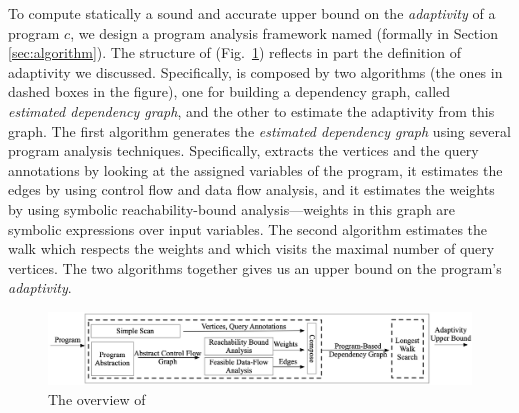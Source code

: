 To compute statically a sound and accurate upper bound on the \emph{adaptivity} of a program $c$,
we design a program analysis framework named {\THESYSTEM} (formally in Section \ref{sec:algorithm}). 
The structure of {\THESYSTEM} (Fig.~\ref{fig:adaptfun}) reflects in part the definition of adaptivity we discussed. Specifically, {\THESYSTEM} is composed by two algorithms (the ones in dashed boxes in the figure), one for building a dependency graph, called \emph{estimated dependency graph}, and the other to estimate the adaptivity from this graph.  
The first algorithm generates the \emph{estimated dependency graph} using several program analysis techniques. Specifically,
 {\THESYSTEM} extracts the vertices and the query annotations by looking at the assigned variables of the program, it estimates the edges by using control flow and data flow analysis, and it estimates the weights by using symbolic reachability-bound analysis---weights in this graph are symbolic expressions over input variables. 
The second algorithm estimates the
walk which respects the weights and which visits the maximal number of query vertices.
The two algorithms together gives us an  upper bound on the program's \emph{adaptivity}.

 \begin{figure}
  \centering    
\includegraphics[width=1.0\columnwidth]{adapfun.png}
  \vspace{-0.8cm}
  \caption{The overview of {\THESYSTEM}}
  \label{fig:adaptfun}
  \vspace{-0.5cm}
\end{figure}

